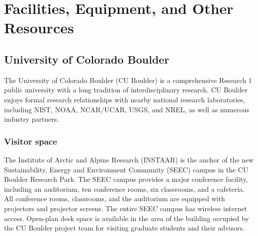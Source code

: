 \section*{Facilities, Equipment, and Other Resources}

\subsection*{University of Colorado Boulder}

The University of Colorado Boulder (CU Boulder) is a comprehensive Research 1 public university with a long tradition of interdisciplinary research. CU Boulder enjoys formal research relationships with nearby national research laboratories, including NIST, NOAA, NCAR/UCAR, USGS, and NREL, as well as numerous industry partners.

\subsubsection*{Visitor space}

The Institute of Arctic and Alpine Research (INSTAAR) is the anchor of the new Sustainability, Energy and Environment Community (SEEC) campus in the CU Boulder Research Park. 
The SEEC campus provides a major conference facility, including an auditorium, ten conference rooms, six classrooms, and a cafeteria. 
All conference rooms, classrooms, and the auditorium are equipped with projectors and projector screens. 
The entire SEEC campus has wireless internet access. Open-plan desk space is available in the area of the building occupied by the CU Boulder project team for visiting graduate students and their advisors.



